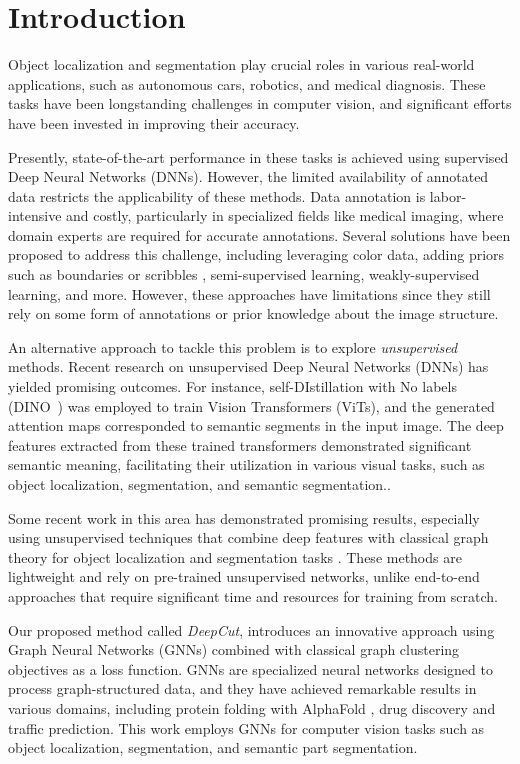 \documentclass[10pt,twocolumn,letterpaper]{article}
\begin{document}
\section{Introduction}
\label{sec:intro}
Object localization and segmentation play crucial roles in various real-world applications, such as autonomous cars, robotics, and medical diagnosis. These tasks have been longstanding challenges in computer vision, and significant efforts have been invested in improving their accuracy.

Presently, state-of-the-art performance in these tasks is achieved using supervised Deep Neural Networks (DNNs). However, the limited availability of annotated data restricts the applicability of these methods. Data annotation is labor-intensive and costly, particularly in specialized fields like medical imaging, where domain experts are required for accurate annotations. Several solutions have been proposed to address this challenge, including leveraging color data, adding priors such as boundaries or scribbles \cite{lin2016scribblesup}, semi-supervised learning\cite{assran2021semi, kirillov2023segany}, weakly-supervised learning\cite{ren2020instance}, and more. However, these approaches have limitations since they still rely on some form of annotations or prior knowledge about the image structure.

An alternative approach to tackle this problem is to explore \emph{unsupervised} methods. Recent research on unsupervised Deep Neural Networks (DNNs) has yielded promising outcomes. For instance, self-DIstillation with No labels (DINO~\cite{caron2021emerging}) was employed to train Vision Transformers (ViTs), and the generated attention maps corresponded to semantic segments in the input image. The deep features extracted from these trained transformers demonstrated significant semantic meaning, facilitating their utilization in various visual tasks, such as object localization, segmentation, and semantic segmentation.\cite{amir2021deep, melas2022deep, wang2022self}.

Some recent work in this area has demonstrated promising results, especially using unsupervised techniques that combine deep features with classical graph theory for object localization and segmentation tasks \cite{melas2022deep, wang2022self}.
These methods are lightweight and rely on pre-trained unsupervised networks, unlike end-to-end approaches that require significant time and resources for training from scratch.

Our proposed method called \emph{DeepCut}, introduces an innovative approach using Graph Neural Networks (GNNs) combined with classical graph clustering objectives as a loss function. GNNs are specialized neural networks designed to process graph-structured data, and they have achieved remarkable results in various domains, including protein folding with AlphaFold \cite{jumper2021highly}, drug discovery \cite{you2018graph} and traffic prediction\cite{jiang2022graph}. This work employs GNNs for computer vision tasks such as object localization, segmentation, and semantic part segmentation.
\end{document}
